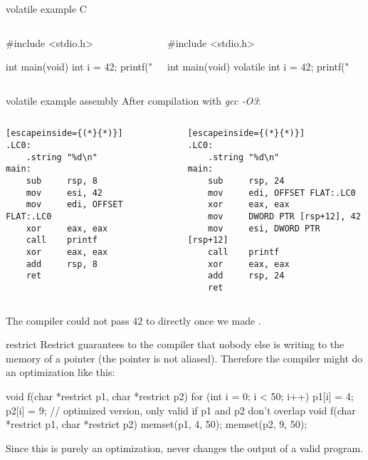 \documentclass[10pt,graphics,aspectratio=169,table]{beamer}
\begin{document}
    \begin{frame}[fragile]{volatile example C}
        
        \begin{columns}
        \begin{codeblock}
#include <stdio.h>

int main(void) {
    int i = 42;
    printf("%
}
        \end{codeblock}
        \begin{codeblock}
#include <stdio.h>

int main(void) {
    volatile int i = 42;
    printf("%
}
        \end{codeblock}
        \end{columns}
    \end{frame}
    \begin{frame}[fragile]{volatile example assembly}
        After compilation with \textit{gcc -O3}:
        \begin{columns}
            \begin{small}
            \begin{lstlisting}[escapeinside={(*}{*)}]
.LC0:
    .string "%d\n"
main:
    sub     rsp, 8
    mov     esi, 42
    mov     edi, OFFSET FLAT:.LC0
    xor     eax, eax
    call    printf
    xor     eax, eax
    add     rsp, 8
    ret
            \end{lstlisting}
            \end{small}
            \begin{small}
            \begin{lstlisting}[escapeinside={(*}{*)}]
.LC0:
    .string "%d\n"
main:
    sub     rsp, 24
    mov     edi, OFFSET FLAT:.LC0
    xor     eax, eax
    mov     DWORD PTR [rsp+12], 42
    mov     esi, DWORD PTR [rsp+12]
    call    printf
    xor     eax, eax
    add     rsp, 24
    ret
            \end{lstlisting}
            \end{small}
        \end{columns}
        \bigskip
        The compiler could not pass 42 to  directly once we 
        made  .
        \end{frame}

    \begin{frame}[fragile]{restrict}
        Restrict guarantees to the compiler that nobody else is 
        writing to the memory of a pointer (the pointer is not aliased).
Therefore the compiler might do an optimization like this:
        \begin{codeblock}
void f(char *restrict p1, char *restrict p2) {
    for (int i = 0; i < 50; i++) {
        p1[i] = 4;
        p2[i] = 9;
    }
}
// optimized version, only valid if p1 and p2 don't overlap
void f(char *restrict p1, char *restrict p2) {
    memset(p1, 4, 50);
    memset(p2, 9, 50);
}
    \end{codeblock}

    Since this is purely an optimization,  never changes the output
    of a valid program.
    \end{frame}
\end{document}
